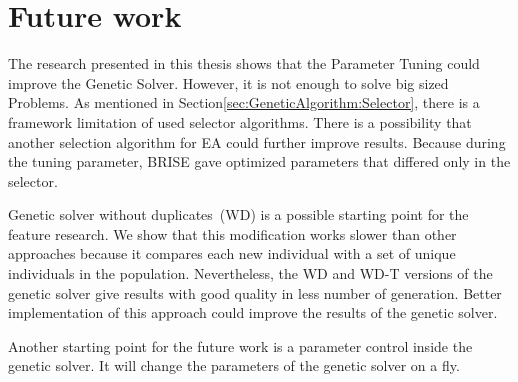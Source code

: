 \chapter{Future work}

The research presented in this thesis shows that the Parameter Tuning could improve the Genetic Solver. However, it is not enough to solve big sized Problems. As mentioned in Section\ref{sec:GeneticAlgorithm:Selector}, there is a framework limitation of used selector algorithms. There is a possibility that another selection algorithm for EA could further improve results. Because during the tuning parameter, BRISE gave optimized parameters that differed only in the selector.

Genetic solver without duplicates~(WD) is a possible starting point for the feature research. We show that this modification works slower than other approaches because it compares each new individual with a set of unique individuals in the population. Nevertheless, the WD and WD-T versions of the genetic solver give results with good quality in less number of generation. Better implementation of this approach could improve the results of the genetic solver.

Another starting point for the future work is a parameter control inside the genetic solver. It will change the parameters of the genetic solver on a fly. 